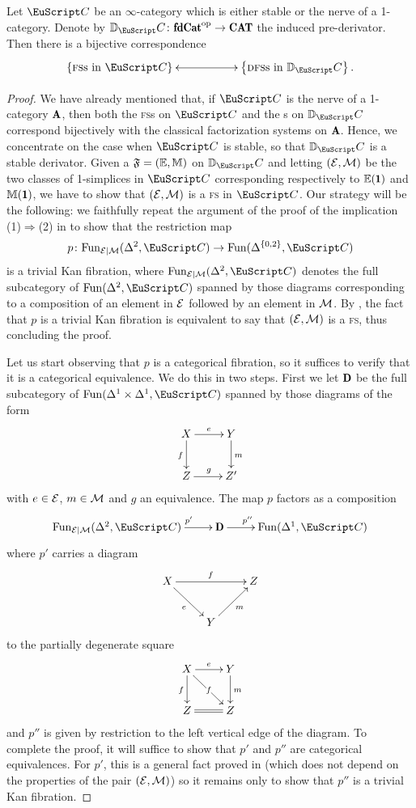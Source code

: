 \begin{theorem}\label{infinity_FS_vs_CFS}
Let $\iC$ be an $\infty$-category which is either stable or the nerve of a 1-category. Denote by $\D_\iC\colon \fincat^\opp\to \Cat$ the induced pre-derivator. Then there is a bijective correspondence
\[
\xymatrix{
\left\{\text{\textsc{fs}s in $\iC$}\right\}\ar@{<->}[rr]&&\left\{\text{{\dfs}s in $\D_\iC$}\right\}.
}
\]
\end{theorem}
\begin{proof}
We have already mentioned that, if $\iC$ is the nerve of a 1-category $\A$, then both the \textsc{fs}s on $\iC$ and the {\dfs}s on $\D_\iC$ correspond bijectively with the classical factorization systems on $\A$. Hence, we concentrate on the case when $\iC$ is stable, so that $\D_\iC$ is a stable derivator. Given a \dfs $\mathfrak{F}=(\mathbb E,\mathbb M)$ on $\D_\iC$ and letting $(\mathcal{E},\mathcal{M})$ be the two classes of 1-simplices in $\iC$ corresponding respectively to $\mathbb E(\uno)$ and $\mathbb M(\uno)$, we have to show that $(\mathcal{E},\mathcal{M})$ is a \textsc{fs} in $\iC$. Our strategy will be the following: we faithfully repeat the argument of the proof of the implication (1)$\Rightarrow$(2) in \cite[\aprop \textbf{5.2.8.17}]{HTT} to show that the restriction map 
\[
p\colon \Fun_{\E|\M}(\Delta^2,\iC)\to \Fun(\Delta^{\{0,2\}},\iC)
\] 
is a trivial Kan fibration, where $\Fun_{\E|\M}(\Delta^2,\iC)$ denotes the full subcategory of $\Fun(\Delta^2,\iC)$ spanned by those diagrams 
corresponding to a composition of an element in $\mathcal{E}$ followed by an element in $\mathcal{M}$. By \cite[\emph{ibi}]{HTT}, the fact that $p$ is a trivial Kan fibration is equivalent to say that $(\mathcal{E},\mathcal{M})$ is a \textsc{fs}, thus concluding the proof.

Let us start observing that $p$ is a categorical fibration, so it suffices to verify that it is a  categorical equivalence. We do this in two steps. First we let $\sD$ be the full subcategory of $\Fun(\Delta^1\times \Delta^1,\iC)$ spanned by those diagrams of the form
\[\xymatrix{
X\ar[r]^e\ar[d]_f&Y\ar[d]^m\\
Z\ar[r]^g&Z'
}\]
with $e\in \mathcal{E}$, $m\in \mathcal{M}$ and $g$ an equivalence. The map $p$ factors as a composition
\[
\xymatrix{
\Fun_{\E|\M}(\Delta^2,\iC)\ar[r]^(.7){p'}&\sD\ar[r]^(.3){p''}& \Fun(\Delta^{1},\iC)
}
\] 
where $p'$ carries a diagram
\[
\xymatrix{
X\ar[rr]^f\ar[rd]_e&&Z\\
&Y\ar[ur]_m}
\]
to the partially degenerate square
\[\xymatrix{
X\ar[dr]|f\ar[r]^e\ar[d]_f&Y\ar[d]^m\\
Z\ar@{=}[r]&Z
}\]
and $p''$ is given by restriction to the left vertical edge of the diagram. To complete the proof, it will suffice to show that $p'$ and $p''$ are categorical equivalences. For $p'$, this is a general fact proved in \cite[\emph{ibi}]{HTT} (which does not depend on the properties of the pair $(\mathcal{E},\mathcal{M})$) so it remains only to show that $p''$ is a trivial Kan fibration.


\end{proof}

